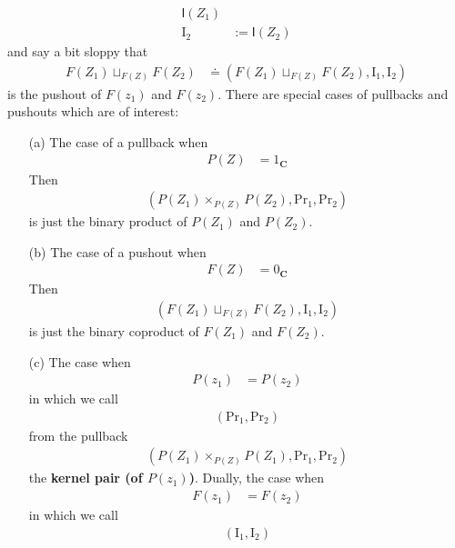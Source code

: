 \begin{exa}
\begin{enumerate}
\begin{align*}
  \mathsf{I}(Z_{1})
  \\
  \mathrm{I}_{2}
  &:=
  \mathsf{I}(Z_{2})
\end{align*}
and say a bit sloppy that
\begin{align*}
  F(Z_{1})
  \sqcup_{F(Z)}
  F(Z_{2})
  &\doteq
  \left(
    F(Z_{1})
    \sqcup_{F(Z)}
    F(Z_{2}),
    \mathrm{I}_{1},
    \mathrm{I}_{2}
  \right)
\end{align*}
is the pushout of $F(z_{1})$ and $F(z_{2})$. There are special cases of pullbacks and pushouts which are of interest:
\begin{enumerate}
\item[(a)]
The case of a pullback when
\begin{align*}
  P(Z)
  &=
  1_{\mathbf{C}}
\end{align*}
Then
\begin{align*}
  \left(
    P(Z_{1})
    \times_{P(Z)}
    P(Z_{2}),
    \mathrm{Pr}_{1},
    \mathrm{Pr}_{2}
  \right)
\end{align*}
is just the binary product of $P(Z_{1})$ and $P(Z_{2})$.
\item[(b)]
The case of a pushout when
\begin{align*}
  F(Z)
  &=
  0_{\mathbf{C}}
\end{align*}
Then
\begin{align*}
  \left(
    F(Z_{1})
    \sqcup_{F(Z)}
    F(Z_{2}),
    \mathrm{I}_{1},
    \mathrm{I}_{2}
  \right)
\end{align*}
is just the binary coproduct of $F(Z_{1})$ and $F(Z_{2})$.
\item[(c)]
The case when
\begin{align*}
  P(z_{1})
  &=
  P(z_{2})
\end{align*}
in which we call
\begin{align*}
  \left(
    \mathrm{Pr}_{1},
    \mathrm{Pr}_{2}
  \right)
\end{align*}
from the pullback
\begin{align*}
  \left(
    P(Z_{1})
    \times_{P(Z)}
    P(Z_{1}),
    \mathrm{Pr}_{1},
    \mathrm{Pr}_{2}
  \right)
\end{align*}
the \textbf{kernel pair (of $P(z_{1})$)}. Dually, the case when
\begin{align*}
  F(z_{1})
  &=
  F(z_{2})
\end{align*}
in which we call
\begin{align*}
  \left(
    \mathrm{I}_{1},
    \mathrm{I}_{2}
  \right)
\end{align*}

\end{enumerate}
\end{enumerate}
\end{exa}
